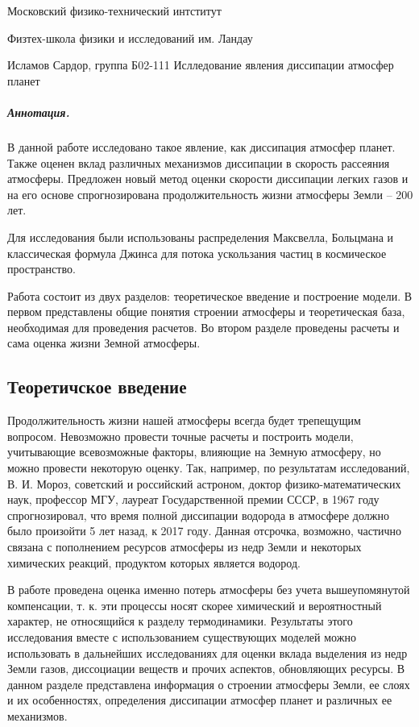 \documentclass[12pt,a4paper]{article}
\author{Московский физико-технический интститут\\Исламов Сардор, группа Б02-111}
\begin{document}
	

\begin{center}

    Московский физико-технический интститут

    Физтех-школа физики и исследований им. Ландау

    Исламов Сардор, группа Б02-111
    \vskip 0.5cm   
    \Large{Ислледование явления диссипации атмосфер планет}
\end{center}

\subparagraph*{Аннотация.}
В данной работе исследовано такое явление, как диссипация атмосфер планет. 
Также оценен вклад различных механизмов диссипации в скорость рассеяния атмосферы. 
Предложен новый метод оценки скорости диссипации легких газов и на его основе спрогнозирована продолжительность жизни атмосферы Земли -- 200 лет.

Для исследования были использованы распределения Максвелла, Больцмана и классическая формула Джинса для потока ускользания частиц в космическое пространство. 

Работа состоит из двух разделов: теоретическое введение и построение модели. 
В первом представлены общие понятия строении атмосферы и теоретическая база, необходимая для проведения расчетов.
Во втором разделе проведены расчеты и сама оценка жизни Земной атмосферы.

\subsection*{Теоретичское введение}
Продолжительность жизни нашей атмосферы всегда будет трепещущим вопросом.
Невозможно провести точные расчеты и построить модели, учитывающие всевозможные факторы, влияющие на Земную атмосферу, но можно провести некоторую оценку. 
Так, например, по результатам исследований, В. И. Мороз, советский и российский астроном, доктор физико-математических наук, профессор МГУ, лауреат Государственной премии СССР, в 1967 году спрогнозировал, что время полной диссипации водорода в атмосфере должно было произойти 5 лет назад, к 2017 году.
Данная отсрочка, возможно, частично связана с пополнением ресурсов атмосферы из недр Земли и некоторых химических реакций, продуктом которых является водород.

В работе проведена оценка именно потерь атмосферы без учета вышеупомянутой компенсации, т. к. эти процессы носят скорее химический и вероятностный характер, не относящийся к разделу термодинамики.
Результаты этого исследования вместе с использованием существующих моделей можно использовать в дальнейших исследованиях для оценки вклада выделения из недр Земли газов, диссоциации веществ и прочих аспектов, обновляющих ресурсы.
В данном разделе представлена информация о строении атмосферы Земли, ее слоях и их особенностях, определения диссипации атмосфер планет и различных ее механизмов.
\end{document}
